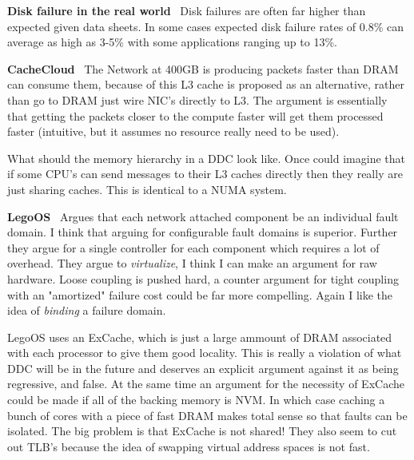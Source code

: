 \textbf{Disk failure in the real
world}~\cite{Schroeder:2007:DFR:1267903.1267904} Disk failures are often far
higher than expected given data sheets. In some cases expected disk failure
rates of 0.8\% can average as high as 3-5\% with some applications ranging up to
13\%.

\textbf{CacheCloud}~\cite{cachecloud} The Network at 400GB is producing packets faster than DRAM can consume them, because of this L3 cache is proposed as an alternative, rather than go to DRAM just wire NIC's directly to L3. The argument is essentially that getting the packets closer to the compute faster will get them processed faster (intuitive, but it assumes no resource really need to be used).

What should the memory hierarchy in a DDC look like. Once could imagine that if some CPU's can send messages to their L3 caches directly then they really are just sharing caches. This is identical to a NUMA system.


\textbf{LegoOS}~\cite{legoos} Argues that each network attached component be an
individual fault domain. I think that arguing for configurable fault domains is
superior. Further they argue for a single controller for each component which
requires a lot of overhead. They argue to \textit{virtualize}, I think I can
make an argument for raw hardware. Loose coupling is pushed hard, a counter
argument for tight coupling with an "amortized" failure cost could be far more
compelling. Again I like the idea of \textit{binding} a failure domain.

LegoOS uses an ExCache, which is just a large ammount of DRAM associated with
each processor to give them good locality. This is really a violation of what
DDC will be in the future and deserves an explicit argument against it as
being regressive, and false. At the same time an argument for the necessity of
ExCache could be made if all of the backing memory is NVM. In which case
caching a bunch of cores with a piece of fast DRAM makes total sense so that
faults can be isolated. The big problem is that ExCache is not shared! They
also seem to cut out TLB's because the idea of swapping virtual address spaces
is not fast.

